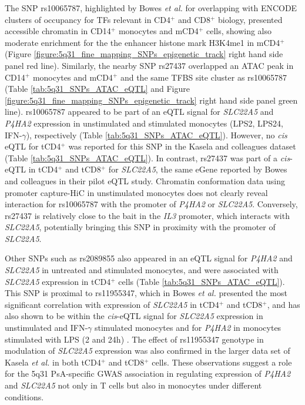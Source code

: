 The SNP rs10065787, highlighted by Bowes \textit{et al.} for overlapping with ENCODE clusters of occupancy for TFs relevant in CD4$^+$ and CD8$^+$ biology, presented accessible chromatin in CD14$^+$ monocytes and mCD4$^+$ cells, showing also moderate enrichment for the the enhancer histone mark H3K4me1 in mCD4$^+$ (Figure \ref{figure:5q31_fine_mapping_SNPs_epigenetic_track} right hand side panel red line). Similarly, the nearby SNP rs27437 overlapped an ATAC peak in CD14$^+$ monocytes and mCD4$^+$ and the same TFBS site cluster as rs10065787 (Table \ref{tab:5q31_SNPs_ATAC_eQTL} and Figure \ref{figure:5q31_fine_mapping_SNPs_epigenetic_track} right hand side panel green line). rs10065787 appeared to be part of an eQTL signal for \textit{SLC22A5} and \textit{P4HA2} expression in unstimulated and stimulated monocytes (LPS2, LPS24, IFN-$\gamma$), respectively (Table \ref{tab:5q31_SNPs_ATAC_eQTL}). However, no \textit{cis} eQTL for tCD4$^+$ was reported for this SNP in the Kasela and colleagues dataset (Table \ref{tab:5q31_SNPs_ATAC_eQTL}). In contrast, rs27437 was part of a \textit{cis}-eQTL in tCD4$^+$ and tCD8$^+$ for \textit{SLC22A5}, the same eGene reported by Bowes and colleagues in their pilot eQTL study. Chromatin conformation data using promoter capture-HiC \parencite{Javierre2016} in unstimulated monocytes does not clearly reveal interaction for rs10065787 with the promoter of \textit{P4HA2} or \textit{SLC22A5}. Conversely, rs27437 is relatively close to the bait in the \textit{IL3} promoter, which interacts with \textit{SLC22A5}, potentially bringing this SNP in proximity with the promoter of \textit{SLC22A5}.  



Other SNPs such as rs2089855 also appeared in an eQTL signal for \textit{P4HA2} and \textit{SLC22A5} in untreated and stimulated monocytes, and were associated with \textit{SLC22A5} expression in tCD4$^+$ cells (Table \ref{tab:5q31_SNPs_ATAC_eQTL}). This SNP is proximal to rs11955347, which in Bowes \textit{et al.} presented the most significant correlation with expression of \textit{SLC22A5} in tCD4$^+$ and tCD8$^+$, and has also shown to be within the \textit{cis}-eQTL signal for \textit{SLC22A5} expression in unstimulated and IFN-$\gamma$ stimulated monocytes and for \textit{P4HA2} in monocytes stimulated with LPS (2 and 24h) \parencite{Fairfax2014}. The effect of rs11955347 genotype in modulation of \textit{SLC22A5} expression was also confirmed in the larger data set of Kasela \textit{et al.} in both tCD4$^+$ and tCD8$^+$ cells. These observations suggest a role for the 5q31 PsA-specific GWAS association in regulating expression of \textit{P4HA2} and \textit{SLC22A5} not only in T cells but also in monocytes under different conditions.

